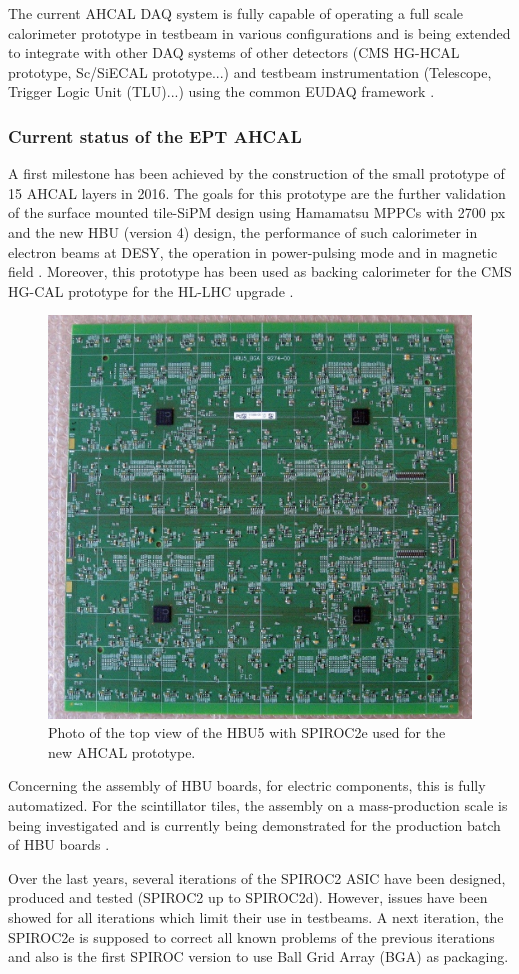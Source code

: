 The current AHCAL DAQ system is fully capable of operating a full scale calorimeter prototype in testbeam in various configurations and is being extended to integrate with other DAQ systems of other detectors (CMS HG-HCAL prototype, Sc/SiECAL prototype...) and testbeam instrumentation (Telescope, Trigger Logic Unit (TLU)...) using the common EUDAQ framework \cite{Kvasnicka:CR_IEEE2016, Kvasnicka:2017bpx, Wing:2296332}.

\subsubsection{Current status of the EPT AHCAL}

A first milestone has been achieved by the construction of the small prototype of 15 AHCAL layers in 2016. The goals for this prototype are the further validation of the surface mounted tile-SiPM design using Hamamatsu MPPCs with 2700 px and the new HBU (version 4) design, the performance of such calorimeter in electron beams at DESY, the operation in power-pulsing mode and in magnetic field \cite{CR_IEEE2017}. Moreover, this prototype has been used as backing calorimeter for the CMS HG-CAL prototype for the HL-LHC upgrade \cite{Felix:AHCALMain2017_HGHCAL}.

\begin{figure}[htbp!]
  \centering
  \includegraphics[width=0.45\linewidth]{chap3/fig/HBU5_BGA.png}
  \caption{Photo of the top view of the HBU5 with SPIROC2e used for the new AHCAL prototype.} \label{fig:HBU5_BGA}
\end{figure}

Concerning the assembly of HBU boards, for electric components, this is fully automatized. For the scintillator tiles, the assembly on a mass-production scale is being investigated and is currently being demonstrated for the production batch of HBU boards \cite{Phi:AHCALMain2017}.

Over the last years, several iterations of the SPIROC2 ASIC have been designed, produced and tested (SPIROC2 up to SPIROC2d). However, issues have been showed for all iterations which limit their use in testbeams. A next iteration, the SPIROC2e is supposed to correct all known problems of the previous iterations and also is the first SPIROC version to use Ball Grid Array (BGA) as packaging.

